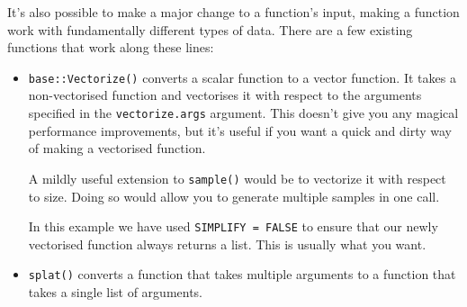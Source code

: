 It's also possible to make a major change to a function's input, making
a function work with fundamentally different types of data. There are a
few existing functions that work along these lines:

\begin{itemize}
\item
  \texttt{base::Vectorize()} converts a scalar function to a vector
  function. It takes a non-vectorised function and vectorises it with
  respect to the arguments specified in the \texttt{vectorize.args}
  argument. This doesn't give you any magical performance improvements,
  but it's useful if you want a quick and dirty way of making a
  vectorised function. 

  A mildly useful extension to \texttt{sample()} would be to vectorize
  it with respect to size. Doing so would allow you to generate multiple
  samples in one call. 

\begin{Shaded}
\begin{Highlighting}[]
\StringTok{ }\NormalTok{, } \NormalTok{)}
\NormalTok{(}\NormalTok{(}\NormalTok{:}\NormalTok{, }\NormalTok{(}\NormalTok{, }\NormalTok{, }\NormalTok{)))}
\NormalTok{(}\NormalTok{(}\NormalTok{:}\NormalTok{, }\NormalTok{:}\NormalTok{))}
\end{Highlighting}
\end{Shaded}

  In this example we have used \texttt{SIMPLIFY = FALSE} to ensure that
  our newly vectorised function always returns a list. This is usually
  what you want.
\item
  \texttt{splat()} converts a function that takes multiple arguments to
  a function that takes a single list of arguments. 

\begin{Shaded}
\begin{Highlighting}[]
\StringTok{ }
  \NormalTok{\}}
\NormalTok{\}}
\end{Highlighting}
\end{Shaded}


\end{itemize}
